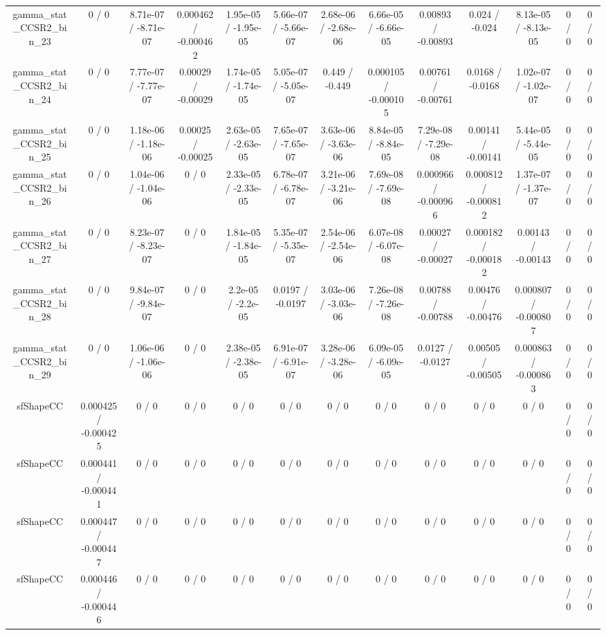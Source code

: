 \documentclass[10pt]{article}
\begin{document}
\begin{table}[htbp]
\begin{center}
\begin{tabular}{|c|c|c|c|c|c|c|c|c|c|c|c|c|}
  gamma_stat_CCSR2_bin_23 & 0 / 0 & 8.71e-07 / -8.71e-07 & 0.000462 / -0.000462 & 1.95e-05 / -1.95e-05 & 5.66e-07 / -5.66e-07 & 2.68e-06 / -2.68e-06 & 6.66e-05 / -6.66e-05 & 0.00893 / -0.00893 & 0.024 / -0.024 & 8.13e-05 / -8.13e-05 & 0 / 0 & 0 / 0 \\ 
  gamma_stat_CCSR2_bin_24 & 0 / 0 & 7.77e-07 / -7.77e-07 & 0.00029 / -0.00029 & 1.74e-05 / -1.74e-05 & 5.05e-07 / -5.05e-07 & 0.449 / -0.449 & 0.000105 / -0.000105 & 0.00761 / -0.00761 & 0.0168 / -0.0168 & 1.02e-07 / -1.02e-07 & 0 / 0 & 0 / 0 \\ 
  gamma_stat_CCSR2_bin_25 & 0 / 0 & 1.18e-06 / -1.18e-06 & 0.00025 / -0.00025 & 2.63e-05 / -2.63e-05 & 7.65e-07 / -7.65e-07 & 3.63e-06 / -3.63e-06 & 8.84e-05 / -8.84e-05 & 7.29e-08 / -7.29e-08 & 0.00141 / -0.00141 & 5.44e-05 / -5.44e-05 & 0 / 0 & 0 / 0 \\ 
  gamma_stat_CCSR2_bin_26 & 0 / 0 & 1.04e-06 / -1.04e-06 & 0 / 0 & 2.33e-05 / -2.33e-05 & 6.78e-07 / -6.78e-07 & 3.21e-06 / -3.21e-06 & 7.69e-08 / -7.69e-08 & 0.000966 / -0.000966 & 0.000812 / -0.000812 & 1.37e-07 / -1.37e-07 & 0 / 0 & 0 / 0 \\ 
  gamma_stat_CCSR2_bin_27 & 0 / 0 & 8.23e-07 / -8.23e-07 & 0 / 0 & 1.84e-05 / -1.84e-05 & 5.35e-07 / -5.35e-07 & 2.54e-06 / -2.54e-06 & 6.07e-08 / -6.07e-08 & 0.00027 / -0.00027 & 0.000182 / -0.000182 & 0.00143 / -0.00143 & 0 / 0 & 0 / 0 \\ 
  gamma_stat_CCSR2_bin_28 & 0 / 0 & 9.84e-07 / -9.84e-07 & 0 / 0 & 2.2e-05 / -2.2e-05 & 0.0197 / -0.0197 & 3.03e-06 / -3.03e-06 & 7.26e-08 / -7.26e-08 & 0.00788 / -0.00788 & 0.00476 / -0.00476 & 0.000807 / -0.000807 & 0 / 0 & 0 / 0 \\ 
  gamma_stat_CCSR2_bin_29 & 0 / 0 & 1.06e-06 / -1.06e-06 & 0 / 0 & 2.38e-05 / -2.38e-05 & 6.91e-07 / -6.91e-07 & 3.28e-06 / -3.28e-06 & 6.09e-05 / -6.09e-05 & 0.0127 / -0.0127 & 0.00505 / -0.00505 & 0.000863 / -0.000863 & 0 / 0 & 0 / 0 \\ 
  sfShapeCC & 0.000425 / -0.000425 & 0 / 0 & 0 / 0 & 0 / 0 & 0 / 0 & 0 / 0 & 0 / 0 & 0 / 0 & 0 / 0 & 0 / 0 & 0 / 0 & 0 / 0 \\ 
  sfShapeCC & 0.000441 / -0.000441 & 0 / 0 & 0 / 0 & 0 / 0 & 0 / 0 & 0 / 0 & 0 / 0 & 0 / 0 & 0 / 0 & 0 / 0 & 0 / 0 & 0 / 0 \\ 
  sfShapeCC & 0.000447 / -0.000447 & 0 / 0 & 0 / 0 & 0 / 0 & 0 / 0 & 0 / 0 & 0 / 0 & 0 / 0 & 0 / 0 & 0 / 0 & 0 / 0 & 0 / 0 \\ 
  sfShapeCC & 0.000446 / -0.000446 & 0 / 0 & 0 / 0 & 0 / 0 & 0 / 0 & 0 / 0 & 0 / 0 & 0 / 0 & 0 / 0 & 0 / 0 & 0 / 0 & 0 / 0 \\ 

\end{tabular}
\end{center}
\end{table}
\end{document}
